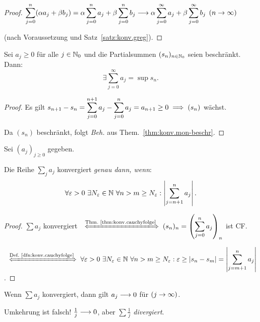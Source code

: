 \documentclass[12pt]{scrreprt}
\begin{document}
\begin{proof}
$\displaystyle\sum^n_{j=0}(\alpha a_j +\beta b_j) = \alpha\sum^n_{j=0}a_j + \beta\sum^n_{j=0}b_j\longrightarrow\alpha\sum^\infty_{j=0}a_j+\beta\sum^\infty_{j=0}b_j$ $(n\rightarrow\infty)$

(nach Voraussetzung und Satz~\ref{satz:konv.greg}).
\end{proof}

\begin{satz}
  \label{satz:reihen.beschr-gwert}
  Sei $a_j\geq 0$ für alle $j\in\mathbb{N}_0$ und die Partialsummen $(s_n)_{n\in\mathbb{N}_0}$ seien beschränkt. Dann:
  \[\exists\sum^\infty_{j=0}a_j = \sup s_n.\]
\end{satz}

\begin{proof} Es gilt $\displaystyle s_{n+1}-s_n=\sum^{n+1}_{j=0}a_j - \sum^n_{j=0}a_j = a_{n+1} \geq 0\implies (s_n)$ wächst.

Da $(s_n)$ beschränkt, folgt \textit{Beh.} aus Them.~\ref{thm:konv.mon-beschr}.
\end{proof}

\begin{satz}
  \label{satz:reihen.cauchy-krit}
  Sei $(a_j)_{j\geq 0}$ gegeben.
  
  Die Reihe $\sum_j a_j$ konvergiert \textit{genau dann, wenn}:
  \begin{equation}\label{eqn:reihen.cauchy}
  \forall\varepsilon > 0\ \exists N_\varepsilon\in\mathbb{N}\ \forall n>m\geq N_\varepsilon: \left\lvert\sum^n_{j=n+1}a_j\right\lvert.
  \end{equation}
\end{satz}

\begin{proof}$\sum a_j$ konvergiert $\displaystyle\gdwnach{\text{Thm.~\ref{thm:konv.cauchyfolge}}}(s_n)_n = \left(\sum^n_{j=0}a_j\right)_n$ ist CF.

$\displaystyle\gdwnach{\text{Def.~\ref{dfn:konv.cauchyfolge}}}\forall\ep > 0\ \exists\nat{N_\ep}\ \forall n > m\geq N_\ep: \ep\geq\abs{s_n-s_m}=\abs{\sum^n_{j=m+1}a_j}$.
\end{proof}

\begin{kor}
  \label{kor:reihen.konv-nf}
  Wenn $\sum a_j$ konvergiert, dann gilt $a_j\longrightarrow 0$ für $(j\rightarrow\infty)$.
\end{kor}

\begin{bem*} Umkehrung ist falsch! $\frac{1}{j}\longrightarrow 0$, aber $\sum\frac{1}{j}$ \textit{divergiert}.
\end{bem*}
\end{document}
